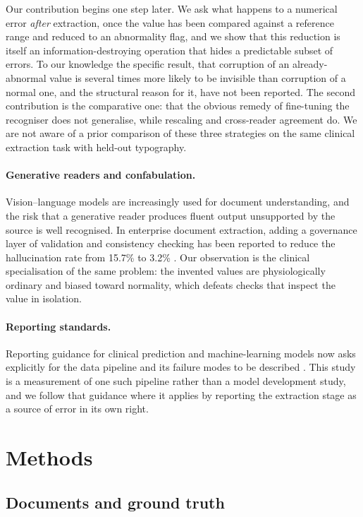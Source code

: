 \documentclass[11pt]{article}
\begin{document}
Our contribution begins one step later. We ask what happens to a numerical error \emph{after}
extraction, once the value has been compared against a reference range and reduced to an
abnormality flag, and we show that this reduction is itself an information-destroying operation
that hides a predictable subset of errors. To our knowledge the specific result, that
corruption of an already-abnormal value is several times more likely to be invisible than
corruption of a normal one, and the structural reason for it, have not been reported. The
second contribution is the comparative one: that the obvious remedy of fine-tuning the
recogniser does not generalise, while rescaling and cross-reader agreement do. We are not aware
of a prior comparison of these three strategies on the same clinical extraction task with
held-out typography.

\paragraph{Generative readers and confabulation.}
Vision--language models are increasingly used for document understanding, and the risk that a
generative reader produces fluent output unsupported by the source is well recognised. In
enterprise document extraction, adding a governance layer of validation and consistency checking
has been reported to reduce the hallucination rate from 15.7\% to 3.2\%
\citep{sediqin2026sage}. Our observation is the clinical specialisation of the same problem: the
invented values are physiologically ordinary and biased toward normality, which defeats checks
that inspect the value in isolation.

\paragraph{Reporting standards.}
Reporting guidance for clinical prediction and machine-learning models now asks explicitly for
the data pipeline and its failure modes to be described \citep{collins2024tripodai}. This study
is a measurement of one such pipeline rather than a model development study, and we follow that
guidance where it applies by reporting the extraction stage as a source of error in its own
right.

\section{Methods}

\subsection{Documents and ground truth}
\end{document}
